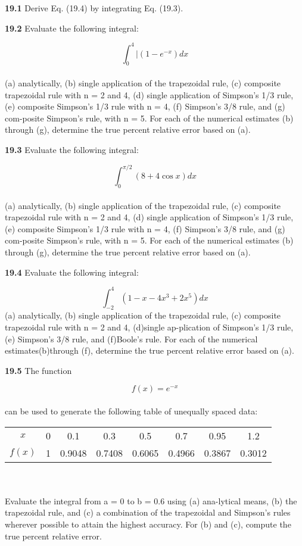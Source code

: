 \documentclass[../main.tex]{subfiles}
\begin{document}
\begin{multicols}{2}
\textbf{19.1} Derive Eq. (19.4) by integrating Eq. (19.3).

\textbf{19.2} Evaluate the following integral:

	$$\int^{4}_{0}|(1-e^{-x})dx$$\\
(a) analytically, (b) single application of the trapezoidal rule,
(c) composite trapezoidal rule with n = 2 and 4, (d) single
application of Simpson's 1/3 rule, (e) composite Simpson's
1/3 rule with n = 4, (f) Simpson's 3/8 rule, and (g) com-posite Simpson's rule, with n = 5. For each of the numerical
estimates (b) through (g), determine the true percent relative
error based on (a).

\textbf{19.3} Evaluate the following integral:

	$$\int^{\pi/2}_{0}(8+4\cos{x})dx$$\\	
(a) analytically, (b) single application of the trapezoidal rule,
(c) composite trapezoidal rule with n = 2 and 4, (d) single
application of Simpson's 1/3 rule, (e) composite Simpson's
1/3 rule with n = 4, (f) Simpson's 3/8 rule, and (g) com-posite Simpson's rule, with n = 5. For each of the numerical
estimates (b) through (g), determine the true percent relative
error based on (a).

\textbf{19.4} Evaluate the following integral:
	
	$$\int^{4}_{-2}(1-x-4x^{3}+2x^5)dx$$
(a) analytically, (b) single application of the trapezoidal rule,
(c) composite trapezoidal rule with n = 2 and 4, (d)single ap-plication of Simpson's 1/3 rule, (e) Simpson's 3/8 rule, and
(f)Boole's rule. For each of the numerical estimates(b)through
(f), determine the true percent relative error based on (a).

\textbf{19.5} The function

	$$f(x)=e^{-x}$$\\
can be used to generate the following table of unequally spaced data:\\
\begin{tabular}{cccccccc}
	\hline
\tiny{$x$} & \tiny{0} & \tiny{0.1} & \tiny{0.3} & \tiny{0.5} & \tiny{0.7} & \tiny{0.95} & \tiny{1.2}\\
\tiny{$f(x)$} & \tiny{1} & \tiny{0.9048} & \tiny{0.7408} & \tiny{0.6065} & \tiny{0.4966} & \tiny{0.3867} & \tiny{0.3012}\\ \hline
\end{tabular}\\
\vspace{0.1pt}\\
Evaluate the integral from a = 0 to b = 0.6 using (a) ana-lytical means, (b) the trapezoidal rule, and (c) a combination
of the trapezoidal and Simpson's rules wherever possible to
attain the highest accuracy. For (b) and (c), compute the true
percent relative error.


\end{multicols}
\end{document}
